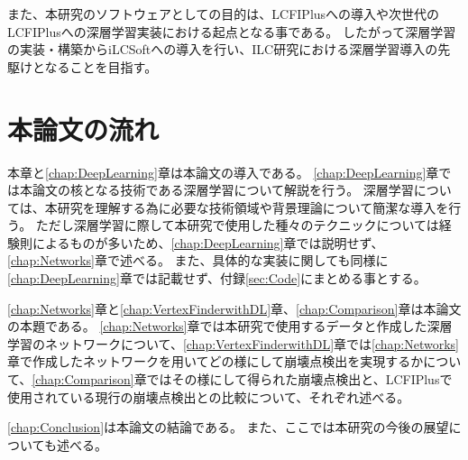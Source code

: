 また、本研究のソフトウェアとしての目的は、LCFIPlusへの導入や次世代のLCFIPlusへの深層学習実装における起点となる事である。
したがって深層学習の実装・構築からiLCSoftへの導入を行い、ILC研究における深層学習導入の先駆けとなることを目指す。


\section{本論文の流れ} \label{Intro:Flow}

本章と\ref{chap:DeepLearning}章は本論文の導入である。
\ref{chap:DeepLearning}章では本論文の核となる技術である深層学習について解説を行う。
深層学習については、本研究を理解する為に必要な技術領域や背景理論について簡潔な導入を行う。
ただし深層学習に際して本研究で使用した種々のテクニックについては経験則によるものが多いため、\ref{chap:DeepLearning}章では説明せず、\ref{chap:Networks}章で述べる。
また、具体的な実装に関しても同様に\ref{chap:DeepLearning}章では記載せず、付録\ref{sec:Code}にまとめる事とする。

\ref{chap:Networks}章と\ref{chap:VertexFinderwithDL}章、\ref{chap:Comparison}章は本論文の本題である。
\ref{chap:Networks}章では本研究で使用するデータと作成した深層学習のネットワークについて、\ref{chap:VertexFinderwithDL}章では\ref{chap:Networks}章で作成したネットワークを用いてどの様にして崩壊点検出を実現するかについて、\ref{chap:Comparison}章ではその様にして得られた崩壊点検出と、LCFIPlusで使用されている現行の崩壊点検出との比較について、それぞれ述べる。

\ref{chap:Conclusion}は本論文の結論である。
また、ここでは本研究の今後の展望についても述べる。














